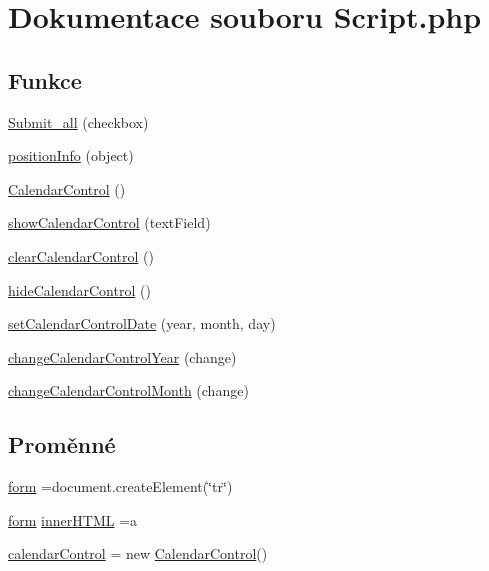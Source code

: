 \hypertarget{_script_8php}{\section{Dokumentace souboru Script.\-php}
\label{_script_8php}
}
\subsection*{Funkce}
\begin{DoxyCompactItemize}
\item 
\hyperlink{_script_8php_a282985a3d190be83684155fc2bdf913a}{Submit\-\_\-all} (checkbox)
\item 
\hyperlink{_script_8php_a0ae3879b1485d976dbcca81646a445a0}{position\-Info} (object)
\item 
\hyperlink{_script_8php_a917d6149b7cc5d51e6277220bbd5998f}{Calendar\-Control} ()
\item 
\hyperlink{_script_8php_ae84c738fcf4af9951c893f964e5319d3}{show\-Calendar\-Control} (text\-Field)
\item 
\hyperlink{_script_8php_a38328a22187c277c0c5e3e1bba91a205}{clear\-Calendar\-Control} ()
\item 
\hyperlink{_script_8php_ae4d0244ab29667db98b7c81f64b24964}{hide\-Calendar\-Control} ()
\item 
\hyperlink{_script_8php_a1cc6b01f3d5c8f354a78581a832beb5c}{set\-Calendar\-Control\-Date} (year, month, day)
\item 
\hyperlink{_script_8php_aebdc2eef88500e388a969654c3d09c46}{change\-Calendar\-Control\-Year} (change)
\item 
\hyperlink{_script_8php_ae1ee2e182db329af38d5834846f18d2e}{change\-Calendar\-Control\-Month} (change)
\end{DoxyCompactItemize}
\subsection*{Proměnné}
\begin{DoxyCompactItemize}
\item 
\hyperlink{_script_8php_a5250c7b8d4db609ffe17f7211a9b7619}{form} =document.\-create\-Element(\char`\"{}tr\char`\"{})
\item 
\hyperlink{classform}{form} \hyperlink{_script_8php_aebe3b19cee99465ce9a35bf7039278aa}{inner\-H\-T\-M\-L} =a
\item 
\hyperlink{_script_8php_af4e0d1472a2bccc2eae419c82caa093a}{calendar\-Control} = new \hyperlink{_script_8php_a917d6149b7cc5d51e6277220bbd5998f}{Calendar\-Control}()
\end{DoxyCompactItemize}


